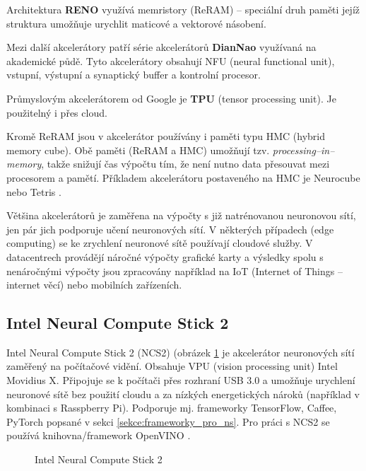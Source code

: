 Architektura \textbf{RENO} využívá memristory (ReRAM) -- speciální druh paměti jejíž struktura umožňuje urychlit maticové a vektorové násobení.

Mezi další akcelerátory patří série akcelerátorů \textbf{DianNao} využívaná na akademické půdě. Tyto akcelerátory obsahují NFU (neural functional unit), vstupní, výstupní a synaptický buffer a kontrolní procesor.

Průmyslovým akcelerátorem od Google je \textbf{TPU} (tensor processing unit). Je použitelný i přes cloud.

Kromě ReRAM jsou v akcelerátor používány i paměti typu HMC (hybrid memory cube). Obě paměti (ReRAM a HMC) umožňují tzv. \emph{processing--in--memory}, takže snižují čas výpočtu tím, že není nutno data přesouvat mezi procesorem a pamětí. Příkladem akcelerátoru postaveného na HMC je Neurocube \cite{neurocube} nebo Tetris \cite{tetris}.

Většina akcelerátorů je zaměřena na výpočty s již natrénovanou neuronovou sítí, jen pár jich podporuje učení neuronových sítí. V některých případech (edge computing) se ke zrychlení neuronové sítě používají cloudové služby. V datacentrech provádějí náročné výpočty grafické karty a výsledky spolu s nenáročnými výpočty jsou zpracovány například na IoT (Internet of Things -- internet věcí) nebo mobilních zařízeních.

\subsection*{Intel Neural Compute Stick 2}

Intel Neural Compute Stick 2 (NCS2) \cite{ncs2} (obrázek \ref{obrazek:ncs2} je akcelerátor neuronových sítí zaměřený na počítačové vidění. Obsahuje VPU (vision processing unit) Intel Movidius X. Připojuje se k počítači přes rozhraní USB 3.0 a umožňuje urychlení neuronové sítě bez použití cloudu a za nízkých energetických nároků (například v kombinaci s Rasspberry Pi). Podporuje mj. frameworky TensorFlow, Caffee, PyTorch popsané v sekci \ref{sekce:frameworky_pro_ns}. Pro práci s NCS2 se používá knihovna/framework OpenVINO \cite{openvino}. 

\begin{figure}[H]
  \begin{center}
  \label{obrazek:ncs2}
  \caption{Intel Neural Compute Stick 2 \cite{ncs2}}
  \end{center}
\end{figure}

